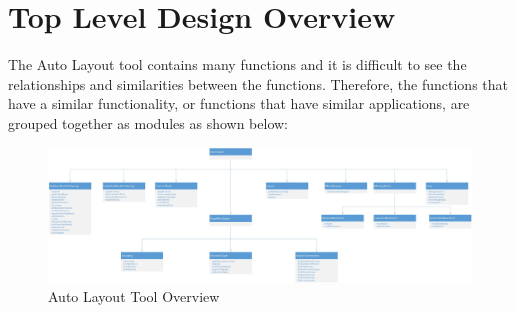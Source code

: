 \documentclass[12pt,letterpaper]{report}
\newcommand{\tool}{Auto Layout\xspace}
\begin{document}
\chapter{Top Level Design Overview} \label{TopLevelDesign}
\par The \tool tool contains many functions and it is difficult to see the relationships and similarities between the functions. Therefore, the functions that have a similar functionality, or functions that have similar applications, are grouped together as modules as shown below:
\begin{figure}[h]
	\centering
	\includegraphics[width=1\linewidth]{images/AutoLayout_chart}
	\caption{\tool Tool Overview}
	\label{fig:autolayoutchart}
\end{figure}
\end{document}
